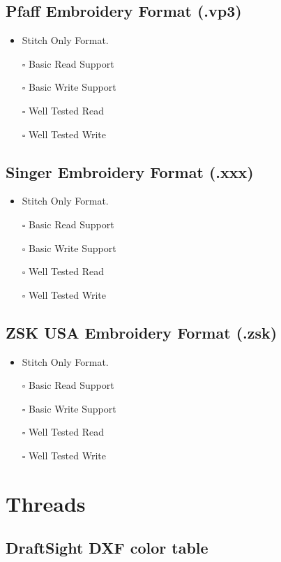 \documentclass[onesize, a4paper]{refart}
\providecommand{\tightlist}{\setlength{\itemsep}{0pt}\setlength{\parskip}{0pt}}
\begin{document}
\subsection{Pfaff Embroidery Format (.vp3)}

\begin{itemize}
\tightlist
\item Stitch Only Format.
\item[$\square$] Basic Read Support
\item[$\square$] Basic Write Support
\item[$\square$] Well Tested Read
\item[$\square$] Well Tested Write
\end{itemize}

\subsection{Singer Embroidery Format (.xxx)}

\begin{itemize}
\tightlist
\item Stitch Only Format.
\item[$\square$] Basic Read Support
\item[$\square$] Basic Write Support
\item[$\square$] Well Tested Read
\item[$\square$] Well Tested Write
\end{itemize}

\subsection{ZSK USA Embroidery Format (.zsk)}

\begin{itemize}
\tightlist
\item Stitch Only Format.
\item[$\square$] Basic Read Support
\item[$\square$] Basic Write Support
\item[$\square$] Well Tested Read
\item[$\square$] Well Tested Write
\end{itemize}

\section{Threads}

\subsection{DraftSight DXF color table}
\end{document}
